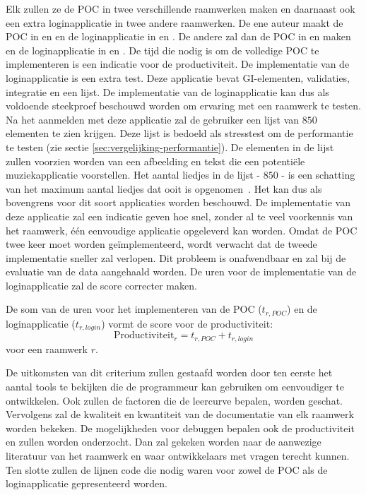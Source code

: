 Elk zullen ze de POC in twee verschillende raamwerken maken en daarnaast ook een extra loginapplicatie in twee andere raamwerken.
De ene auteur maakt de POC in \jqm{} en \lungo{} en de loginapplicatie in \st{} en \kendo{}.
De andere zal dan de POC in \st{} en \kendo{} maken en de loginapplicatie in \jqm{} en \lungo{}.
De tijd die nodig is om de volledige POC te implementeren is een indicatie voor de productiviteit. 
De implementatie van de loginapplicatie is een extra test.
Deze applicatie bevat GI-elementen, validaties,  integratie en een lijst.
De implementatie van de loginapplicatie kan dus als voldoende steekproef beschouwd worden om ervaring met een raamwerk te testen.
Na het aanmelden met deze applicatie zal de gebruiker een lijst van $850$ elementen te zien krijgen.
Deze lijst is bedoeld als stresstest om de performantie te testen (zie sectie \ref{sec:vergelijking-performantie}).
De elementen in de lijst zullen voorzien worden van een afbeelding en tekst die een potentiële muziekapplicatie voorstellen.
Het aantal liedjes in de lijst - $850$ - is een schatting van het maximum aantal liedjes dat ooit is opgenomen~\cite{Zimmy2011}.
Het kan dus als bovengrens voor dit soort applicaties worden beschouwd.
De implementatie van deze applicatie zal een indicatie geven hoe snel,  zonder al te veel voorkennis van het raamwerk,  één eenvoudige applicatie opgeleverd kan worden.
Omdat de POC twee keer moet worden geïmplementeerd, wordt verwacht dat de tweede implementatie sneller zal verlopen.
Dit probleem is onafwendbaar en zal bij de evaluatie van de data aangehaald worden.
De uren voor de implementatie van de loginapplicatie zal de score correcter maken.

De som van de uren voor het implementeren van de POC ($t_{r,POC}$) en de loginapplicatie ($t_{r,login}$) vormt de score voor de productiviteit:
\begin{equation}
  \text{Productiviteit}_r = {t_{r,POC} + t_{r,login}}
  \label{eq:productiviteit}
\end{equation}
voor een raamwerk $r$.

De uitkomsten van dit criterium zullen gestaafd worden door ten eerste het aantal tools te bekijken die de programmeur kan gebruiken om eenvoudiger te ontwikkelen.
Ook zullen de factoren die de leercurve bepalen, worden geschat.
Vervolgens zal de kwaliteit en kwantiteit van de documentatie van elk raamwerk worden bekeken.
De mogelijkheden voor debuggen bepalen ook de productiviteit en zullen worden onderzocht.
Dan zal gekeken worden naar de aanwezige literatuur van het raamwerk en waar ontwikkelaars met vragen terecht kunnen.
Ten slotte zullen de lijnen code die nodig waren voor zowel de POC als de loginapplicatie gepresenteerd worden.

